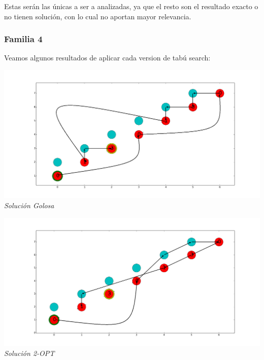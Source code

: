 Estas ser\'an las únicas a ser a analizadas, ya que el resto son el resultado exacto o no tienen soluci\'on, con lo cual no aportan mayor relevancia.
 
\subsubsection*{Familia 4}

Veamos algunos resultados de aplicar cada version de tabú search:

\vspace*{0.3cm} \vspace*{0.3cm}
  \begin{center}
 \includegraphics[scale=0.3]{./EJ4/fam4goloso.png}\\
 {            \textit{Soluci\'on Golosa}}
  \end{center}
  \vspace*{0.3cm}

\vspace*{0.3cm} \vspace*{0.3cm}
  \begin{center}
 \includegraphics[scale=0.3]{./EJ4/fam42opt.png}\\
 {            \textit{Soluci\'on 2-OPT}}
  \end{center}
  \vspace*{0.3cm}

